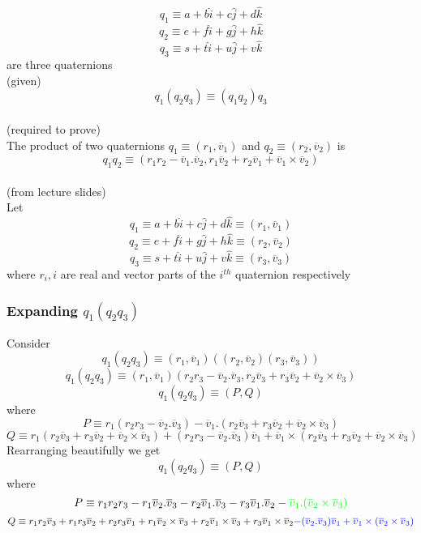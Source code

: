 \documentclass[12pt]{article}
\newcommand{\fromlectures}{{\\ \color{blue} \hspace*{\fill}(from lecture slides)} \\}
\newcommand{\given}{{\\ \color{blue} \hspace*{\fill}(given)} \\}
\newcommand{\rtp}{{\\ \color{blue} \hspace*{\fill}(required to prove)} \\}
\newcommand{\vv}[1]{\overline{v}_{#1}}
\begin{document}
\section{}
\[
  q_1 \equiv a + b \hat{i} + c \hat{j} + d \hat{k}
\]
\[
  q_2 \equiv e + f \hat{i} + g \hat{j} + h \hat{k}
\]
\[
  q_3 \equiv s + t \hat{i} + u \hat{j} + v \hat{k}
\]
are three quaternions
\given

\[
  q_1(q_2q_3) \equiv (q_1q_2)q_3
\]
\rtp

The product of two quaternions $ q_1 \equiv (r_1, \vv{1}) $ and $ q_2 \equiv (r_2, \vv{2}) $ is
\[
  q_1q_2 \equiv (r_1 r_2 - \vv{1} . \vv{2}, r_1 \vv{2} + r_2 \vv{1} + \vv{1}\times\vv{2})
\]
\fromlectures

Let
\[
  q_1 \equiv a + b \hat{i} + c \hat{j} + d \hat{k} \equiv (r_1, \vv{1})
\]
\[
  q_2 \equiv e + f \hat{i} + g \hat{j} + h \hat{k} \equiv (r_2, \vv{2})
\]
\[
  q_3 \equiv s + t \hat{i} + u \hat{j} + v \hat{k} \equiv (r_3, \vv{3})
\]
where $r_i, i$ are real and vector parts of the $i^{th}$ quaternion respectively

\subsubsection*{Expanding $q_1(q_2q_3)$}
Consider
\[
  q_1(q_2q_3) \equiv (r_1, \vv{1}) ((r_2, \vv{2})(r_3, \vv{3}))
\]
\[
  q_1(q_2q_3) \equiv (r_1, \vv{1}) (r_2r_3 - \vv{2}.\vv{3}, r_2 \vv{3} + r_3 \vv{2} + \vv{2}\times\vv{3})
\]
\[
  q_1(q_2q_3) \equiv (P, Q)
\]
where
\[
  P \equiv r_1(r_2r_3 - \vv{2}.\vv{3}) - \vv{1}.(r_2 \vv{3} + r_3 \vv{2} + \vv{2}\times\vv{3})
\]
\[
  Q \equiv  r_1(r_2 \vv{3} + r_3 \vv{2} + \vv{2}\times\vv{3})
    + (r_2r_3 - \vv{2}.\vv{3})\vv{1}
    + \vv{1} \times (r_2 \vv{3} + r_3 \vv{2} + \vv{2}\times\vv{3})
\]
Rearranging beautifully we get
\[
  q_1(q_2q_3) \equiv (P, Q)
\]
where
\[
  P \equiv r_1r_2r_3 - r_1\vv{2}.\vv{3} - r_2\vv{1}.\vv{3} - r_3\vv{1}.\vv{2} - {\color{green} \vv{1} . (\vv{2}\times\vv{3})}
\]
\[
  Q \equiv
  r_1r_2\vv{3}
  + r_1r_3\vv{2}
  + r_2r_3\vv{1}
  + r_1 \vv{2}\times\vv{3}
  + r_2 \vv{1}\times\vv{3}
  + r_3 \vv{1}\times\vv{2}
  {\color{blue}
  - (\vv{2}.\vv{3})\vv{1}
  + \vv{1} \times (\vv{2}\times\vv{3})}
\]
\end{document}
